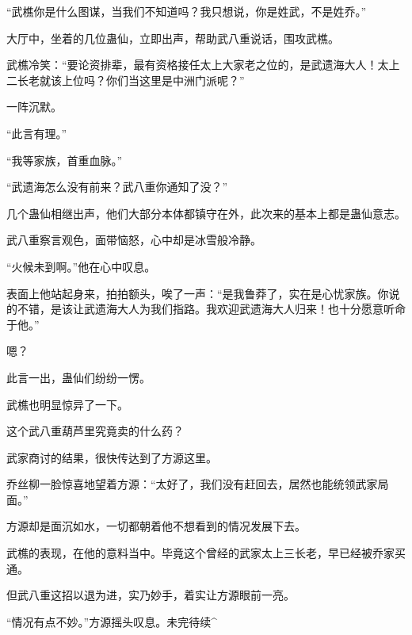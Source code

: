\begin{this_body}
“武樵你是什么图谋，当我们不知道吗？我只想说，你是姓武，不是姓乔。”

大厅中，坐着的几位蛊仙，立即出声，帮助武八重说话，围攻武樵。

武樵冷笑：“要论资排辈，最有资格接任太上大家老之位的，是武遗海大人！太上二长老就该上位吗？你们当这里是中洲门派呢？”

一阵沉默。

“此言有理。”

“我等家族，首重血脉。”

“武遗海怎么没有前来？武八重你通知了没？”

几个蛊仙相继出声，他们大部分本体都镇守在外，此次来的基本上都是蛊仙意志。

武八重察言观色，面带恼怒，心中却是冰雪般冷静。

“火候未到啊。”他在心中叹息。

表面上他站起身来，拍拍额头，唉了一声：“是我鲁莽了，实在是心忧家族。你说的不错，是该让武遗海大人为我们指路。我欢迎武遗海大人归来！也十分愿意听命于他。”

嗯？

此言一出，蛊仙们纷纷一愣。

武樵也明显惊异了一下。

这个武八重葫芦里究竟卖的什么药？

武家商讨的结果，很快传达到了方源这里。

乔丝柳一脸惊喜地望着方源：“太好了，我们没有赶回去，居然也能统领武家局面。”

方源却是面沉如水，一切都朝着他不想看到的情况发展下去。

武樵的表现，在他的意料当中。毕竟这个曾经的武家太上三长老，早已经被乔家买通。

但武八重这招以退为进，实乃妙手，着实让方源眼前一亮。

“情况有点不妙。”方源摇头叹息。未完待续\^{}

\end{this_body}

